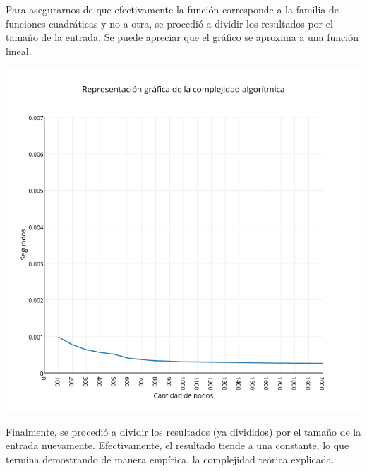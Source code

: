 Para asegurarnos de que efectivamente la función corresponde a la familia de funciones cuadráticas y no a otra, se procedió a dividir los resultados por el tamaño de la entrada.
Se puede apreciar que el gráfico se aproxima a una función lineal.

\includegraphics[width=15cm,keepaspectratio=yes]{imagenes/greedy/worst3.png}

Finalmente, se procedió a dividir los resultados (ya divididos) por el tamaño de la entrada nuevamente.
Efectivamente, el resultado tiende a una constante, lo que termina demostrando de manera empírica, la complejidad teórica explicada.
